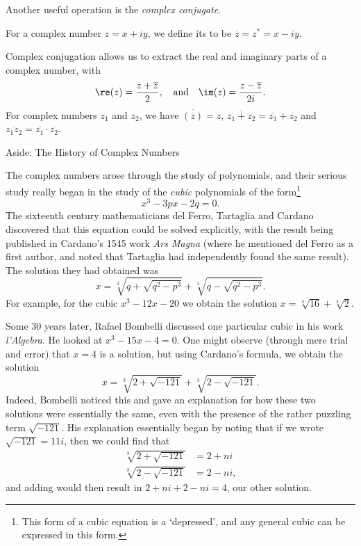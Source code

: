 Another useful operation is the \emph{complex conjugate}. 

\begin{definition}
  For a complex number $z = x + iy$, we define its  to be $\overline{z} = z^* = x - iy$.
\end{definition}

Complex conjugation allows us to extract the real and imaginary parts of a complex number, with
$$
\re(z) = \frac{z+ \overline{z}}{2}, \quad \text{and} \quad \im(z) = \frac{z - \overline{z}}{2i}.
$$
For complex numbers $z_1$ and $z_2$, we have $\overline{(\overline{z})} = z$, $\overline{z_1 + z_2} = \overline{z_1} + \overline{z_2}$ and $\overline{z_1 z_2} = \overline{z_1} \cdot  \overline{z_2}$.

\begin{aside}{Aside: The History of Complex Numbers}

The complex numbers arose through the study of polynomials, and their serious study really began in the study of the \emph{cubic} polynomials of the form\footnote{This form of a cubic equation is a `depressed', and any general cubic can be expressed in this form.}
$$
x^3 - 3px - 2q = 0.
$$
The sixteenth century mathematicians del Ferro, Tartaglia and Cardano discovered that this equation could be solved explicitly, with the result being published in Cardano's 1545 work \emph{Ars Magna} (where he mentioned del Ferro as a first author, and noted that Tartaglia had independently found the same result).
The solution they had obtained was
$$
x = \sqrt[3]{q + \sqrt{q^2 - p^3}} + \sqrt[3]{q - \sqrt{q^2 - p^3}}.
$$
For example, for the cubic $x^3 - 12x - 20$ we obtain the solution $x = \sqrt[3]{16} + \sqrt[3]{2}$. 

Some 30 years later, Rafael Bombelli discussed one particular cubic in his work \emph{l'Algebra}. He looked at $x^3 - 15x - 4 = 0$.
One might observe (through mere trial and error) that $x = 4$ is a solution, but using Cardano's formula, we obtain the solution
$$
x = \sqrt[3]{2 + \sqrt{-121}} + \sqrt[3]{2 - \sqrt{-121}}.
$$
Indeed, Bombelli noticed this and gave an explanation for how these two solutions were essentially the same, even with the presence of the rather puzzling term $\sqrt{-121}$.
His explanation essentially began by noting that if we wrote $\sqrt{-121} = 11i$, then we could find that
\begin{align*}
	\sqrt[3]{2 + \sqrt{-121}} &= 2 + ni \\
	\sqrt[3]{2 - \sqrt{-121}} &= 2 - ni,
\end{align*}
and adding would then result in $2 + ni + 2 - ni = 4$, our other solution.


\end{aside}
